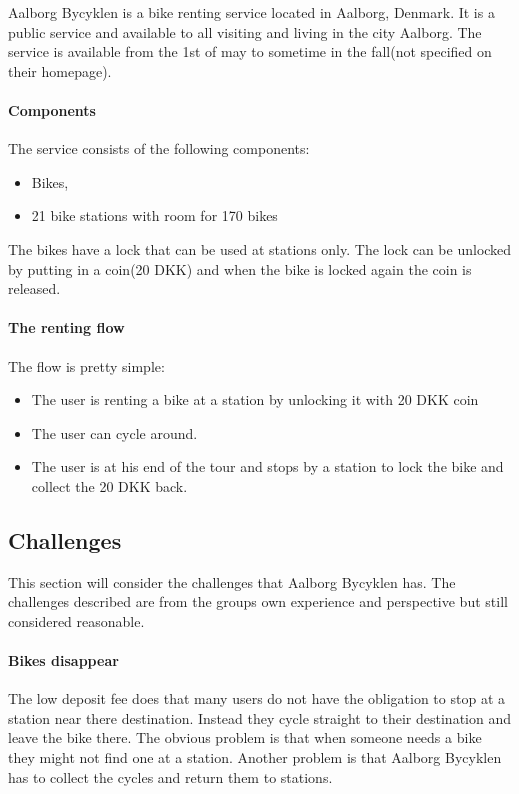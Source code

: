 Aalborg Bycyklen is a bike renting service located in Aalborg, Denmark.
It is a public service and available to all visiting and living in the city Aalborg.
The service is available from the 1st of may to sometime in the fall(not specified on their homepage).
\cite{aalborgbycyklenbagcyklen}

\paragraph{Components}
The service consists of the following components:
\begin{itemize}
\item Bikes, 
\item 21 bike stations with room for 170 bikes
\end{itemize}
The bikes have a lock that can be used at stations only.
The lock can be unlocked by putting in a coin(20 DKK) and when the bike is locked again the coin is released.

\paragraph{The renting flow}
The flow is pretty simple:
\begin{itemize}
\item The user is renting a bike at a station by unlocking it with 20 DKK coin
\item The user can cycle around.
\item The user is at his end of the tour and stops by a station to lock the bike and collect the 20 DKK back.
\end{itemize}

\subsection{Challenges}
This section will consider the challenges that Aalborg Bycyklen has.
The challenges described are from the groups own experience and perspective but still considered reasonable.

\paragraph{Bikes disappear}
The low deposit fee does that many users do not have the obligation to stop at a station near there destination.
Instead they cycle straight to their destination and leave the bike there.
The obvious problem is that when someone needs a bike they might not find one at a station.
Another problem is that Aalborg Bycyklen has to collect the cycles and return them to stations.

